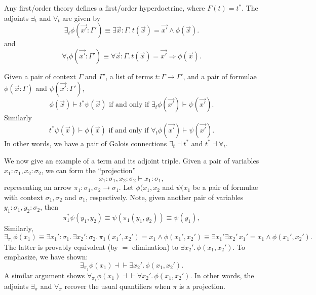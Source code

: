 \documentclass[../main.tex]{subfiles}
\begin{document}
Any first\-/order theory defines a first\-/order hyperdoctrine, where \(F(t) =
t^*\). The adjoints \(\exists_t\) and \(\forall_t\) are given by
\[%
  \exists_t \phi( \vec{x'} : \Gamma' ) \equiv \exists \vec{x} : \Gamma
  .\, t(\vec{x}) = \vec{x'} \wedge \phi(\vec{x}).
\]%
and
\[%
  \forall_t \phi(\vec{x'} : \Gamma' ) \equiv \forall \vec{x} : \Gamma.\,
  t(\vec{x}) = \vec{x'} \Rightarrow \phi(\vec{x}).
\]%
\begin{theorem}
  Given a pair of context \(\Gamma\) and \(\Gamma'\), a list of terms \(t :
  \Gamma \to \Gamma'\), and a pair of formulae \(\phi( \vec{x} : \Gamma )\) and
  \(\psi(\vec{x'} : \Gamma')\),
  \[%
    \phi(\vec{x}) \vdash t^* \psi(\vec{x}) \text{ if and only if } \exists_t
    \phi(\vec{x'}) \vdash \psi(\vec{x'}).
  \]%
  Similarly
  \[%
    t^* \psi(\vec{x}) \vdash \phi(\vec{x}) \text{ if and only if } \forall_t
    \phi(\vec{x'}) \vdash \psi(\vec{x'}).
  \]%
  In other words, we have a pair of Galois connections \(\exists_t \dashv t^*\)
  and \(t^* \dashv \forall_t\).
\end{theorem}

We now give an example of a term and its adjoint triple. Given a pair of
variables \(x_1 : \sigma_1, x_2 : \sigma_2\), we can form the ``projection''
\[%
  x_1 : \sigma_1, x_2: \sigma_2 \vdash x_1 : \sigma_1,
\]%
representing an arrow \(\pi_1 : \sigma_1,\sigma_2 \to \sigma_1\). Let
\(\phi(x_1,x_2\) and \(\psi(x_1\) be a pair of formulae with context
\(\sigma_1,\sigma_2\) and \(\sigma_1\), respectively. Note, given another pair
of variables \(y_1 : \sigma_1, y_2 : \sigma_2\), then
\[%
  \pi_1^* \psi(y_1,y_2) \equiv \psi(\pi_1(y_1,y_2)) \equiv \psi(y_1),
\]%
Similarly,
\[%
  \exists_{\pi_1} \phi(x_1) \equiv \exists x_1' : \sigma_1.\, \exists x_2' :
  \sigma_2 .\, \pi_1(x_1',x_2') = x_1 \wedge \phi(x_1',x_2') \equiv \exists x_1'
  \exists x_2' \, x_1' = x_1 \wedge \phi(x_1',x_2').
\]%
The latter is provably equivalent (by \(=\) elimination) to \(\exists x_2'
.\, \phi(x_1, x_2')\). To emphasize, we have shown:
\[%
  \exists_{\pi_1} \phi(x_1) \dashv \vdash \exists x_2' .\, \phi(x_1,x_2').
\]%
A similar argument shows \(\forall_{\pi_1} \phi(x_1) \dashv\vdash \forall x_2'
.\, \phi(x_1,x_2')\). In other words, the adjoints \(\exists_\pi\) and
\(\forall_\pi\) recover the usual quantifiers when \(\pi\) is a projection.

\ifSubfilesClassLoaded{%
    }%
  
\end{document}
